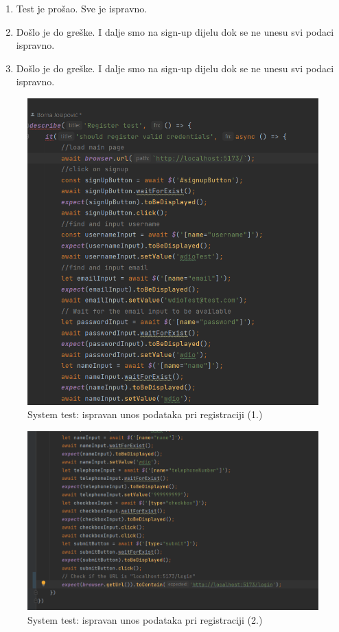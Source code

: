 				\begin{enumerate}
					\item Test je prošao. Sve je ispravno.
					\item Došlo je do greške. I dalje smo na sign-up dijelu dok se ne unesu svi podaci ispravno.
					\item Došlo je do greške. I dalje smo na sign-up dijelu dok se ne unesu svi podaci ispravno.
				\end{enumerate}
			
			\begin{figure}[H]
				\includegraphics[scale=0.7]{slike/sysreg1.PNG} 
				\centering
				\caption{System test: ispravan unos podataka pri registraciji (1.)}
				\label{sysreg1}
			\end{figure}
			
			\begin{figure}[H]
				\includegraphics[scale=0.7]{slike/sysreg2.PNG} 
				\centering
				\caption{System test: ispravan unos podataka pri registraciji (2.)}
				\label{sysreg2}
			\end{figure}
			
